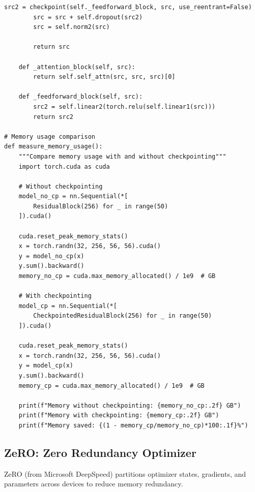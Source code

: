 \begin{lstlisting}[style=python, caption=Gradient checkpointing implementation]
        src2 = checkpoint(self._feedforward_block, src, use_reentrant=False)
        src = src + self.dropout(src2)
        src = self.norm2(src)

        return src

    def _attention_block(self, src):
        return self.self_attn(src, src, src)[0]

    def _feedforward_block(self, src):
        src2 = self.linear2(torch.relu(self.linear1(src)))
        return src2

# Memory usage comparison
def measure_memory_usage():
    """Compare memory usage with and without checkpointing"""
    import torch.cuda as cuda

    # Without checkpointing
    model_no_cp = nn.Sequential(*[
        ResidualBlock(256) for _ in range(50)
    ]).cuda()

    cuda.reset_peak_memory_stats()
    x = torch.randn(32, 256, 56, 56).cuda()
    y = model_no_cp(x)
    y.sum().backward()
    memory_no_cp = cuda.max_memory_allocated() / 1e9  # GB

    # With checkpointing
    model_cp = nn.Sequential(*[
        CheckpointedResidualBlock(256) for _ in range(50)
    ]).cuda()

    cuda.reset_peak_memory_stats()
    x = torch.randn(32, 256, 56, 56).cuda()
    y = model_cp(x)
    y.sum().backward()
    memory_cp = cuda.max_memory_allocated() / 1e9  # GB

    print(f"Memory without checkpointing: {memory_no_cp:.2f} GB")
    print(f"Memory with checkpointing: {memory_cp:.2f} GB")
    print(f"Memory saved: {(1 - memory_cp/memory_no_cp)*100:.1f}%")
\end{lstlisting}

\subsection{ZeRO: Zero Redundancy Optimizer}

ZeRO (from Microsoft DeepSpeed) partitions optimizer states, gradients, and parameters across devices to reduce memory redundancy.

